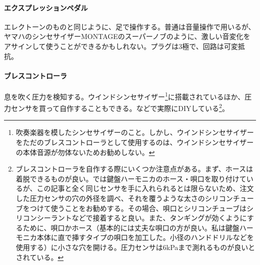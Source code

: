 \documentclass[uplatex, 10pt, dvipdfmx]{jsarticle}
\numberwithin{equation}{section}
\begin{document}
\paragraph{エクスプレッションペダル}

エレクトーンのものと同じように、足で操作する。普通は音量操作で用いるが、ヤマハのシンセサイザーMONTAGEのスーパーノブのように、激しい音変化をアサインして使うことができるかもしれない。プラグは3極で、回路は可変抵抗。

\paragraph{ブレスコントローラ}

息を吹く圧力を検知する。ウインドシンセサイザー\footnote{吹奏楽器を模したシンセサイザーのこと。しかし、ウインドシンセサイザーをただのブレスコントローラとして使用するのは、ウインドシンセサイザーの本体音源が勿体ないためお勧めしない。}に搭載されているほか、圧力センサを買って自作することもできる。\cite{ブレスコントローラ}などで実際にDIYしている\footnote{ブレスコントローラを自作する際にいくつか注意点がある。まず、ホースは着脱できるものが良い。\cite{ブレスコントローラ}では鍵盤ハーモニカのホース・唄口を取り付けているが、この記事と全く同じセンサを手に入れられるとは限らないため、注文した圧力センサの穴の外径を調べ、それを覆うような太さのシリコンチューブをつけて使うことをお勧めする。その場合、唄口とシリコンチューブはシリコンシーラントなどで接着すると良い。また、タンギングが効くようにするために、唄口かホース（基本的には丈夫な唄口の方が良い。私は鍵盤ハーモニカ本体に直で挿すタイプの唄口を加工した。小径のハンドドリルなどを使用する）に小さな穴を開ける。圧力センサは6kPaまで測れるものが良いとされている\cite{ブレスコントローラ}。}。

\clearpage
\end{document}
